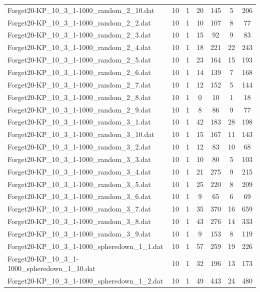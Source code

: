 \begin{table}[!ht]
\begin{tabular}{lcccccc}
Forget20-KP\_10\_3\_1-1000\_random\_2\_10.dat & 10 & 1 & 20 & 145 & 5 & 206 \\
Forget20-KP\_10\_3\_1-1000\_random\_2\_2.dat & 10 & 1 & 10 & 107 & 8 & 77 \\
Forget20-KP\_10\_3\_1-1000\_random\_2\_3.dat & 10 & 1 & 15 & 92 & 9 & 83 \\
Forget20-KP\_10\_3\_1-1000\_random\_2\_4.dat & 10 & 1 & 18 & 221 & 22 & 243 \\
Forget20-KP\_10\_3\_1-1000\_random\_2\_5.dat & 10 & 1 & 23 & 164 & 15 & 193 \\
Forget20-KP\_10\_3\_1-1000\_random\_2\_6.dat & 10 & 1 & 14 & 139 & 7 & 168 \\
Forget20-KP\_10\_3\_1-1000\_random\_2\_7.dat & 10 & 1 & 12 & 152 & 5 & 144 \\
Forget20-KP\_10\_3\_1-1000\_random\_2\_8.dat & 10 & 1 & 0 & 10 & 1 & 18 \\
Forget20-KP\_10\_3\_1-1000\_random\_2\_9.dat & 10 & 1 & 8 & 86 & 9 & 77 \\
Forget20-KP\_10\_3\_1-1000\_random\_3\_1.dat & 10 & 1 & 42 & 183 & 28 & 198 \\
Forget20-KP\_10\_3\_1-1000\_random\_3\_10.dat & 10 & 1 & 15 & 167 & 11 & 143 \\
Forget20-KP\_10\_3\_1-1000\_random\_3\_2.dat & 10 & 1 & 12 & 83 & 10 & 68 \\
Forget20-KP\_10\_3\_1-1000\_random\_3\_3.dat & 10 & 1 & 10 & 80 & 5 & 103 \\
Forget20-KP\_10\_3\_1-1000\_random\_3\_4.dat & 10 & 1 & 21 & 275 & 9 & 215 \\
Forget20-KP\_10\_3\_1-1000\_random\_3\_5.dat & 10 & 1 & 25 & 220 & 8 & 209 \\
Forget20-KP\_10\_3\_1-1000\_random\_3\_6.dat & 10 & 1 & 9 & 65 & 6 & 69 \\
Forget20-KP\_10\_3\_1-1000\_random\_3\_7.dat & 10 & 1 & 35 & 370 & 16 & 659 \\
Forget20-KP\_10\_3\_1-1000\_random\_3\_8.dat & 10 & 1 & 43 & 276 & 14 & 333 \\
Forget20-KP\_10\_3\_1-1000\_random\_3\_9.dat & 10 & 1 & 9 & 153 & 8 & 119 \\
Forget20-KP\_10\_3\_1-1000\_spheredown\_1\_1.dat & 10 & 1 & 57 & 259 & 19 & 226 \\
Forget20-KP\_10\_3\_1-1000\_spheredown\_1\_10.dat & 10 & 1 & 32 & 196 & 13 & 173 \\
Forget20-KP\_10\_3\_1-1000\_spheredown\_1\_2.dat & 10 & 1 & 49 & 443 & 24 & 480 \\

\end{tabular}
\end{table}
